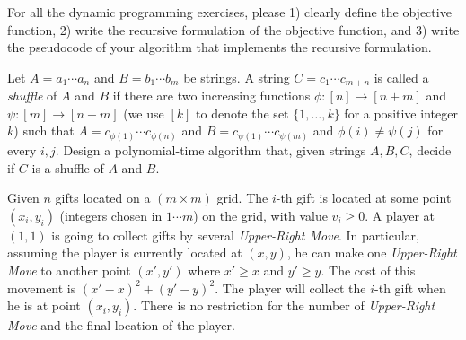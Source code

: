 \documentclass{oxmathproblems}
\begin{document}
\noindent For all the dynamic programming exercises, please
    1) clearly define the objective function,
    2) write the recursive formulation of the objective function, and
    3) write the pseudocode of your algorithm that implements the recursive formulation.

\begin{questions}

\miquestion[25]
Let $A=a_1\cdots a_{n}$ and $B=b_1\cdots b_{m}$ be strings.
A string $C=c_1\cdots c_{m+n}$ is called a \emph{shuffle} of $A$ and $B$ if there are two increasing functions $\phi:[n]\to[n+m]$ and $\psi:[m]\to[n+m]$ (we use $[k]$ to denote the set $\{1,\ldots,k\}$ for a positive integer $k$) such that $A=c_{\phi(1)}\cdots c_{\phi(n)}$ and $B=c_{\psi(1)}\cdots c_{\psi(m)}$ and $\phi(i)\neq\psi(j)$ for every $i,j$. Design a polynomial-time algorithm that, given strings $A,B,C$, decide if $C$ is a shuffle of $A$ and $B$.

\miquestion[25]
Given $n$ gifts located on a $(m \times m)$ grid. The $i$-th gift is located at some point $(x_i,y_i)$ (integers chosen in $1\cdots m$) on the grid, with value $v_i \geq 0$. A player at $(1,1)$ is going to collect gifts by several \emph{Upper-Right Move}. In particular, assuming the player is currently located at $(x,y)$, he can make one \emph{Upper-Right Move} to another point $(x',y')$ where $x'\geq x$ and $y'\geq y$. The cost of this movement is $(x'-x)^2 + (y'-y)^2$. The player will collect the $i$-th gift when he is at point $(x_i,y_i)$. There is no restriction for the number of \emph{Upper-Right Move} and the final location of the player. 


\end{questions}
\end{document}
